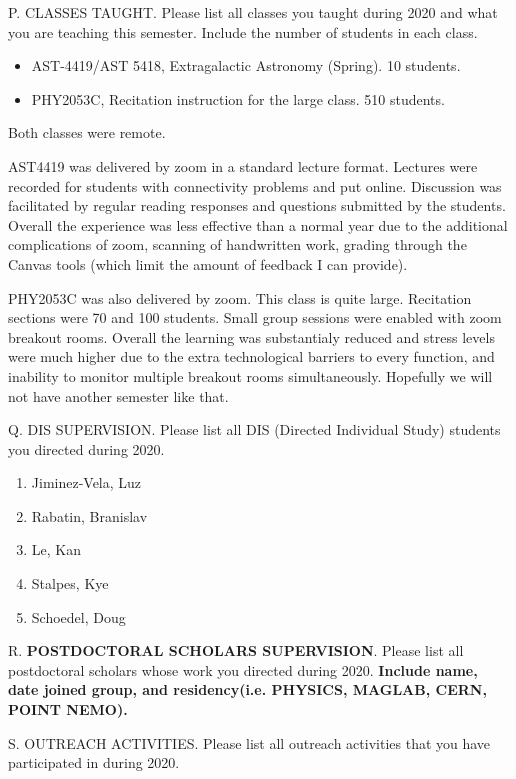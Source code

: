 \noindent P. CLASSES TAUGHT. Please list all classes you taught
during 2020 and what you are teaching this semester.  Include the
number of students in each class.
\bigskip


\begin{itemize}
    \item AST-4419/AST 5418, Extragalactic Astronomy (Spring).  10 students.
    \item PHY2053C, Recitation instruction for the large class. 510 students.
\end{itemize}
Both classes were remote.

AST4419 was delivered by zoom in a standard lecture format.  Lectures were
recorded for students with connectivity problems and put online.  Discussion was
facilitated by regular reading responses and questions submitted by the
students.  Overall the experience was less effective than a normal year due to
the additional complications of zoom, scanning of handwritten work, grading
through the Canvas tools (which limit the amount of feedback I can provide).  

PHY2053C was also delivered by zoom.  This class is quite large.  Recitation
sections were 70 and 100 students.  Small group sessions were enabled with zoom
breakout rooms.  Overall the learning was substantialy reduced and stress levels
were much higher due to the extra technological barriers to every function, and
inability to monitor multiple breakout rooms simultaneously.  Hopefully we will
not have another semester like that.

\noindent Q. DIS SUPERVISION. Please list all DIS (Directed
Individual Study) students you directed during 2020.
\bigskip

\begin{enumerate}
    \item Jiminez-Vela, Luz
    \item Rabatin, Branislav 
    \item Le, Kan
    \item Stalpes, Kye
    \item Schoedel, Doug
\end{enumerate}

\noindent R. {\bf POSTDOCTORAL SCHOLARS SUPERVISION}. Please list all
postdoctoral scholars whose work you directed during 2020.  {\bf Include name,
date joined group, and residency(i.e. PHYSICS, MAGLAB, CERN, POINT NEMO). }
\bigskip

\noindent S. OUTREACH ACTIVITIES. Please list all outreach
activities that you have participated in during 2020.
\bigskip

